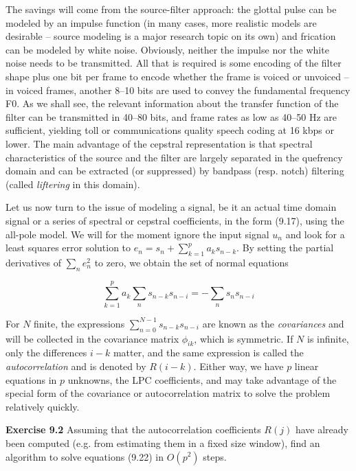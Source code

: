 The savings will come from the source-filter approach: the glottal pulse can
be modeled by an impulse function (in many cases, more realistic models are
desirable -- source modeling is a major research topic on its own) and
frication can be modeled by white noise. Obviously, neither the impulse nor
the white noise needs to be transmitted. All that is required is some encoding
of the filter shape plus one bit per frame to encode whether the frame is
voiced or unvoiced -- in voiced frames, another 8--10 bits are used to convey
the fundamental frequency F0. As we shall see, the relevant information about
the transfer function of the filter can be transmitted in 40--80 bits, and
frame rates as low as 40--50 Hz are sufficient, yielding toll or
communications quality speech coding at 16 kbps or lower. The main advantage
of the cepstral representation is that spectral characteristics of the source
and the filter are largely separated in the quefrency domain and can be
extracted (or suppressed) by bandpass (resp. notch) filtering (called {\it
  liftering} in this domain).

Let us now turn to the issue of modeling a signal, be it an actual time domain
signal or a series of spectral or cepstral coefficients, in the form (9.17),
using the all-pole model. We will for the moment ignore the input signal $u_n$
and look for a least squares error solution to $e_n = s_n + \sum_{k=1}^p
a_ks_{n-k}$. By setting the partial derivatives of $\sum_n e_n^2$ to zero,
we obtain the set of normal equations

\begin{equation}
\sum_{k=1}^p a_k \sum_n s_{n-k}s_{n-i} = - \sum_n s_n s_{n-i}
\end{equation}

\noindent
For $N$ finite, the expressions $\sum_{n=0}^{N-1} s_{n-k} s_{n-i}$ are known
as the {\it covariances} and will be collected in the covariance matrix
$\phi_{ik}$, which is symmetric. If $N$ is infinite, only the differences
$i-k$ matter, and the same expression is called the {\it autocorrelation} and
is denoted by $R(i-k)$. Either way, we have $p$ linear equations in $p$
unknowns, the LPC coefficients, and may take advantage of the special form of
the covariance or autocorrelation matrix to solve the problem relatively
quickly.

\smallskip
\noindent
{\bf Exercise 9.2} Assuming that the autocorrelation coefficients $R(j)$ have
already been computed (e.g. from estimating them in a fixed size window), find
an algorithm to solve equations (9.22) in $O(p^2)$ steps. 

